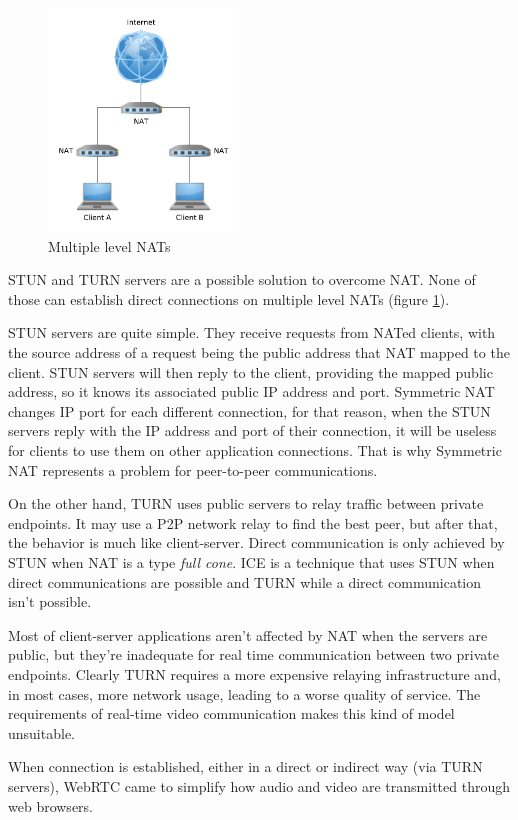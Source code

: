 \begin{figure}[!htb]
	\centering
	\includegraphics[width=0.45\textwidth]{figures/multinat.pdf}
	\caption{Multiple level NATs}
	\label{fig:multinat}
\end{figure}

\ac{STUN} and \ac{TURN} \cite{natvoip} servers are a possible solution to overcome \ac{NAT}. None of those can establish direct connections on multiple level \ac{NAT}s (figure \ref{fig:multinat}).

\ac{STUN} servers are quite simple. They receive requests from \ac{NAT}ed clients, with the source address of a request being the public address that \ac{NAT} mapped to the client. \ac{STUN} servers will then reply to the client, providing the mapped public address, so it knows its associated public \ac{IP} address and port. Symmetric \ac{NAT} changes \ac{IP} port for each different connection, for that reason, when the \ac{STUN} servers reply with the \ac{IP} address and port of their connection, it will be useless for clients to use them on other application connections. That is why Symmetric \ac{NAT} represents a problem for peer-to-peer communications.   

On the other hand, \ac{TURN} uses public servers to relay traffic between private endpoints.
It may use a \ac{P2P} network relay to find the best peer, but after that, the behavior is much like client-server. Direct communication is only achieved by \ac{STUN} when \ac{NAT} is a type \emph{full cone}. \ac{ICE} is a technique that uses \ac{STUN} when direct communications are possible and \ac{TURN} while a direct communication isn't possible.

Most of client-server applications aren't affected by \ac{NAT} when the servers are public, but they're inadequate for real time communication between two private endpoints. Clearly \ac{TURN} requires a more expensive relaying infrastructure and, in most cases, more network usage, leading to a worse quality of service. The requirements of real-time video communication makes this kind of model unsuitable.

When connection is established, either in a direct or indirect way (via \ac{TURN} servers), \ac{WebRTC} came to simplify how audio and video are transmitted through web browsers.
